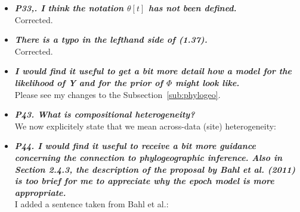 \documentclass[english]{article}
\begin{document}
\begin{itemize}
\item {
{\it
\textbf{
P33,. I think the notation $\theta[t]$ has not been defined.
}%
}%
}%
\\
Corrected.




\item {
{\it
\textbf{
There is a typo in the lefthand side of (1.37).
}%
}%
}%
\\
Corrected.


\item {
{\it
\textbf{
I would find it useful to get a bit more detail how a model for the likelihood of Y and for the prior of $\Phi$ might look like.
}%
}%
}%
\\
Please see my changes to the Subsection~\ref{sub:phylogeo}.




\item {
{\it
\textbf{
P43. What is compositional heterogeneity?
}%
}%
}%
\\
We now explicitely state that we mean across-data (site) heterogeneity:

\begin{quote}
\myeditsvfifteen
\end{quote}


\item {
{\it
\textbf{
P44. I would find it useful to receive a bit more guidance concerning the connection to phylogeographic inference. 
Also in Section 2.4.3, the description of the proposal by Bahl et al. (2011) is too brief for me to appreciate why the epoch model is more appropriate.
}%
}%
}%
\\
I added a sentence taken from Bahl et al.:


\end{itemize}
\end{document}
